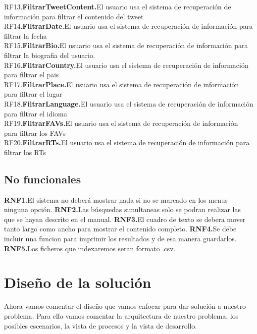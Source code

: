 RF13.\textbf{FiltrarTweetContent.}El usuario usa el sistema de recuperación de información para filtrar el contenido del tweet\\

RF14.\textbf{FiltrarDate.}El usuario usa el sistema de recuperación de información para filtrar la fecha\\

RF15.\textbf{FiltrarBio.}El usuario usa el sistema de recuperación de información para filtrar la biografia del usuario.\\

RF16.\textbf{FiltrarCountry.}El usuario usa el sistema de recuperación de información para filtrar el pais\\

RF17.\textbf{FiltrarPlace.}El usuario usa el sistema de recuperación de información para filtrar el lugar\\

RF18.\textbf{FiltrarLanguage.}El usuario usa el sistema de recuperación de información para filtrar el idioma\\

RF19.\textbf{FiltrarFAVs.}El usuario usa el sistema de recuperación de información para filtrar los FAVs\\

RF20.\textbf{FiltrarRTs.}El usuario usa el sistema de recuperación de información para filtrar los RTs\\


\subsection{No funcionales}

\textbf{RNF1.}El sistema no deberá mostrar nada si no se marcado en los menus ninguna opción.
\textbf{RNF2.}Las búsquedas simultaneas solo se podran realizar las que se hayan descrito en el manual.
\textbf{RNF3.}El cuadro de texto se debera mover tanto largo como ancho para mostrar el contenido completo.
\textbf{RNF4.}Se debe incluir una funcion para imprimir los resultados y de esa manera guardarlos.
\textbf{RNF5.}Los ficheros que indexaremos seran formato .csv.

\section{Diseño de la solución}

Ahora vamos comentar el diseño que vamos enfocar para dar solución a nuestro problema. Para ello vamos comentar la arquitectura de nuestro problema, los posibles escenarios, la vista de procesos y la vista de desarrollo.

